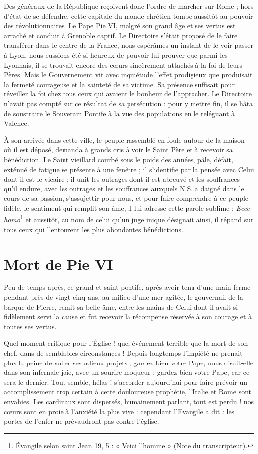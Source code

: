\documentclass[11pt,a4paper]{report}
\begin{document}
Des généraux de la République reçoivent donc l'ordre de marcher sur Rome ; hors d'état de se défendre, cette capitale du monde chrétien tombe aussitôt au pouvoir des révolutionnaires. Le Pape Pie VI, malgré son grand âge et ses vertus est arraché et conduit à Grenoble captif. Le Directoire s'était proposé de le faire transférer dans le centre de la France, nous espérâmes un instant de le voir passer à Lyon, nous eussions été si heureux de pouvoir lui prouver que parmi les Lyonnais, il se trouvait encore des cœurs sincèrement attachés à la foi de leurs Pères. Mais le Gouvernement vit avec inquiétude l'effet prodigieux que produisait la fermeté courageuse et la sainteté de sa victime. Sa présence suffisait pour réveiller la foi chez tous ceux qui avaient le bonheur de l'approcher. Le Directoire n'avait pas compté sur ce résultat de sa persécution : pour y mettre fin, il se hâta de soustraire le Souverain Pontife à la vue des populations en le reléguant à Valence.

À son arrivée dans cette ville, le peuple rassemblé en foule autour de la maison où il est déposé, demanda à grands cris à voir le Saint Père et à recevoir sa bénédiction. Le Saint vieillard courbé sous le poids des années, pâle, défait, exténué de fatigue se présente à une fenêtre ; il s'identifie par la pensée avec Celui dont il est le vicaire ; il unit les outrages dont il est abreuvé et les souffrances qu'il endure, avec les outrages et les souffrances auxquels N.S. a daigné dans le cours de sa passion, s'assujettir pour nous, et pour faire comprendre à ce peuple fidèle, le sentiment qui remplit son âme, il lui adresse cette parole sublime : \textit{Ecce homo}\footnote{Évangile selon saint Jean 19, 5 : « Voici l'homme » (Note du transcripteur).} et aussitôt, au nom de celui qu'un juge inique désignait ainsi, il répand sur tous ceux qui l'entourent les plus abondantes bénédictions.

\section*{Mort de Pie VI}

Peu de temps après, ce grand et saint pontife, après avoir tenu d'une main ferme pendant près de vingt-cinq ans, au milieu d'une mer agitée, le gouvernail de la barque de Pierre, remit sa belle âme, entre les mains de Celui dont il avait si fidèlement servi la cause et fut recevoir la récompense réservée à son courage et à toutes ses vertus.

Quel moment critique pour l'Église ! quel événement terrible que la mort de son chef, dans de semblables circonstances ! Depuis longtemps l'impiété ne prenait plus la peine de voiler ses odieux projets ; gardez bien votre Pape, nous disait-elle dans son infernale joie, avec un sourire moqueur : gardez bien votre Pape, car ce sera le dernier. Tout semble, hélas ! s'accorder aujourd'hui pour faire prévoir un accomplissement trop certain à cette douloureuse prophétie, l'Italie et Rome sont envahies. Les cardinaux sont dispersés, humainement parlant, tout est perdu ! nos cœurs sont en proie à l'anxiété la plus vive : cependant l'Evangile a dit : les portes de l'enfer ne prévaudront pas contre l'église.
\end{document}
